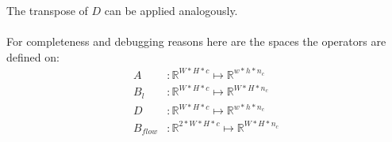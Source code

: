\documentclass[A4,12pt]{article}
\newcommand{\R}{\mathbb{R}}
\begin{document}
The transpose of $D$ can be applied analogously.\\\\
For completeness and debugging reasons here are the spaces the operators are defined on:
\begin{align*}
A&\colon\R^{W*H*c}\mapsto\R^{w*h*n_c} \\
B_l&\colon\R^{W*H*c}\mapsto\R^{W*H*n_c} \\
D&\colon\R^{W*H*c}\mapsto\R^{w*h*n_c} \\
B_{flow}&\colon\R^{2*W*H*c}\mapsto\R^{W*H*n_c}
\end{align*}



\end{document}
